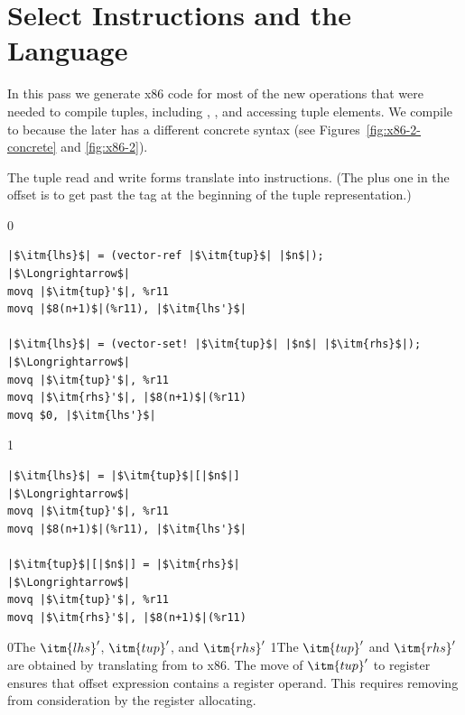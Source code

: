 \documentclass[7x10,nocrop]{TimesAPriori_MIT}%
\def\racketEd{0}
\def\pythonEd{1}
\def\edition{0}
\newcommand{\racket}[1]{{\if\edition\racketEd{#1}\fi}}
\newcommand{\python}[1]{{\if\edition\pythonEd #1\fi}}
\begin{document}
\section{Select Instructions and the \LangXGlobal{} Language}
\label{sec:select-instructions-gc}


In this pass we generate x86 code for most of the new operations that
were needed to compile tuples, including ,
, and accessing tuple elements.
%
We compile  to  because the later has a
different concrete syntax (see Figures~\ref{fig:x86-2-concrete} and
\ref{fig:x86-2}).  

The tuple read and write forms translate into 
instructions.  (The plus one in the offset is to get past the tag at
the beginning of the tuple representation.)
%
\begin{center}
\begin{minipage}{\textwidth}
{\if\edition\racketEd    
\begin{lstlisting}
|$\itm{lhs}$| = (vector-ref |$\itm{tup}$| |$n$|);
|$\Longrightarrow$|
movq |$\itm{tup}'$|, %r11
movq |$8(n+1)$|(%r11), |$\itm{lhs'}$|

|$\itm{lhs}$| = (vector-set! |$\itm{tup}$| |$n$| |$\itm{rhs}$|);
|$\Longrightarrow$|
movq |$\itm{tup}'$|, %r11
movq |$\itm{rhs}'$|, |$8(n+1)$|(%r11)
movq $0, |$\itm{lhs'}$|
\end{lstlisting}
\fi}
{\if\edition\pythonEd    
\begin{lstlisting}
|$\itm{lhs}$| = |$\itm{tup}$|[|$n$|]
|$\Longrightarrow$|
movq |$\itm{tup}'$|, %r11
movq |$8(n+1)$|(%r11), |$\itm{lhs'}$|

|$\itm{tup}$|[|$n$|] = |$\itm{rhs}$|
|$\Longrightarrow$|
movq |$\itm{tup}'$|, %r11
movq |$\itm{rhs}'$|, |$8(n+1)$|(%r11)
\end{lstlisting}
\fi}
\end{minipage}
\end{center}
\racket{The $\itm{lhs}'$, $\itm{tup}'$, and $\itm{rhs}'$}
\python{The $\itm{tup}'$ and $\itm{rhs}'$}
are obtained by translating from \LangCVec{} to x86.
%
The move of $\itm{tup}'$ to
register  ensures that offset expression
 contains a register operand.  This requires
removing  from consideration by the register allocating.
\end{document}
